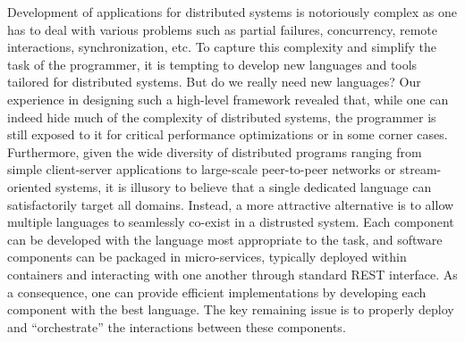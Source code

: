 Development of applications for distributed systems is notoriously complex as one has to deal with various problems such as partial failures, concurrency, remote interactions, synchronization, etc. To capture this complexity and simplify the task of the programmer, it is tempting to develop new languages and tools tailored for distributed systems. But do we really need new languages?
Our experience in designing such a high-level framework revealed that, while one can indeed hide much of the complexity of distributed systems, the programmer is still exposed to it for critical performance optimizations or in some corner cases. Furthermore, given the wide diversity of distributed programs ranging from simple client-server applications to large-scale peer-to-peer networks or stream-oriented systems, it is illusory to believe that a single dedicated language can satisfactorily target all domains.
Instead, a more attractive alternative is to allow multiple languages to seamlessly co-exist in a distrusted system. Each component can be developed with the language most appropriate to the task, and software components can be packaged in micro-services, typically deployed within containers and interacting with one another through standard REST interface. As a consequence, one can provide efficient implementations by developing each component with the best language. The key remaining issue is to properly deploy and “orchestrate” the interactions between these components.
